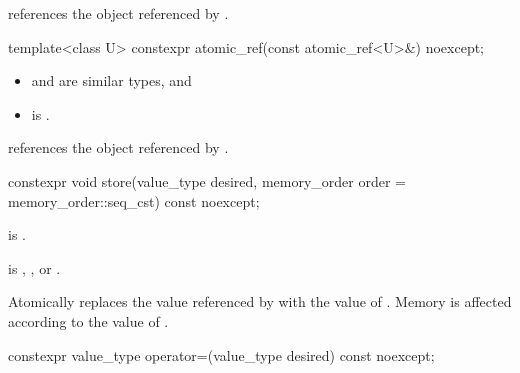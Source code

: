 \begin{itemdescr}
\pnum
\ensures
{} references the object referenced by .
\end{itemdescr}

\begin{itemdecl}
template<class U>
  constexpr atomic_ref(const atomic_ref<U>&) noexcept;
\end{itemdecl}

\begin{itemdescr}
\pnum
\constraints
\begin{itemize}
\item {} and  are similar types, and
\item {} is .
\end{itemize}

\pnum
\ensures
{} references the object referenced by .
\end{itemdescr}

%
%
%
%
\begin{itemdecl}
constexpr void store(value_type desired,
                     memory_order order = memory_order::seq_cst) const noexcept;
\end{itemdecl}

\begin{itemdescr}
\pnum
\constraints
{} is .

\pnum
\expects
{} is
,
, or
.

\pnum
\effects
Atomically replaces the value referenced by 
with the value of .
Memory is affected according to the value of .
\end{itemdescr}

%
%
%
%
\begin{itemdecl}
constexpr value_type operator=(value_type desired) const noexcept;
\end{itemdecl}

